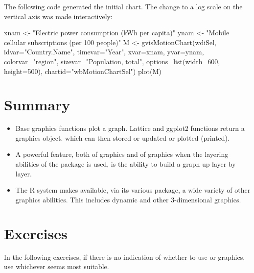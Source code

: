 The following code generated the initial chart.  The change
to a log scale on the vertical axis was made interactively:
\begin{fullwidth}
\begin{Schunk}
\begin{Sinput}
xnam <- "Electric power consumption (kWh per capita)"
ynam <- "Mobile cellular subscriptions (per 100 people)"
M <- gvisMotionChart(wdiSel, idvar="Country.Name", timevar="Year",
                     xvar=xnam, yvar=ynam,
                     colorvar="region", sizevar="Population, total",
                     options=list(width=600, height=500),
                     chartid="wbMotionChartSel")
plot(M)
\end{Sinput}
\end{Schunk}
\end{fullwidth}


\section{Summary}
\begin{itemize}
\item[] Base graphics functions plot a graph.  Lattice and ggplot2
functions return a graphics object. which can then stored or updated
or plotted (printed).

\item[] A powerful feature, both of  graphics and of
   graphics when the layering abilities of the
   package is used, is the ability to build a
  graph up layer by layer.

\item[] The R system makes available, via its various package,
a wide variety of other graphics abilities.  This includes
dynamic and other 3-dimensional graphics.
\end{itemize}


\section{Exercises}\label{sec:plot}
In the following exercises, if there is no indication of whether to
use  or  graphics, use whichever seems
most suitable.

